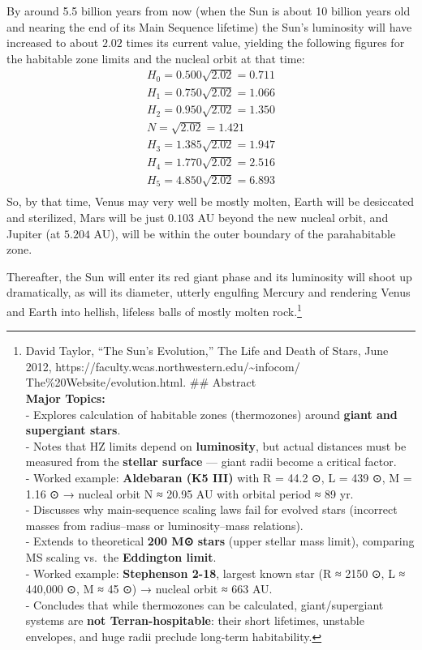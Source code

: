 \documentclass[
  letterpaper,
]{book}
\begin{document}
By around 5.5 billion years from now (when the Sun is about 10 billion
years old and nearing the end of its Main Sequence lifetime) the Sun's
luminosity will have increased to about \(2.02\) times its current
value, yielding the following figures for the habitable zone limits and
the nucleal orbit at that time: \[
\begin{align}
H_0 = 0.500\sqrt{2.02} = 0.711 \\
H_1 = 0.750\sqrt{2.02} = 1.066 \\
H_2 = 0.950\sqrt{2.02} = 1.350 \\
N = \sqrt{2.02} = 1.421 \\
H_3 = 1.385\sqrt{2.02} = 1.947 \\
H_4 = 1.770\sqrt{2.02} = 2.516 \\
H_5 = 4.850\sqrt{2.02} = 6.893 \\
\end{align}
\] So, by that time, Venus may very well be mostly molten, Earth will be
desiccated and sterilized, Mars will be just \(0.103\) AU beyond the new
nucleal orbit, and Jupiter (at \(5.204\) AU), will be within the outer
boundary of the parahabitable zone.

Thereafter, the Sun will enter its red giant phase and its luminosity
will shoot up dramatically, as will its diameter, utterly engulfing
Mercury and rendering Venus and Earth into hellish, lifeless balls of
mostly molten rock.\footnote{David Taylor, ``The Sun's Evolution,'' The
  Life and Death of Stars, June 2012,
  https://faculty.wcas.northwestern.edu/\textasciitilde infocom/
  The\%20Website/evolution.html. \#\# Abstract\\
  \textbf{Major Topics:}\\
  - Explores calculation of habitable zones (thermozones) around
  \textbf{giant and supergiant stars}.\\
  - Notes that HZ limits depend on \textbf{luminosity}, but actual
  distances must be measured from the \textbf{stellar surface} --- giant
  radii become a critical factor.\\
  - Worked example: \textbf{Aldebaran (K5 III)} with R = 44.2 ⊙, L = 439
  ⊙, M = 1.16 ⊙ → nucleal orbit N ≈ 20.95 AU with orbital period ≈ 89
  yr.\\
  - Discusses why main-sequence scaling laws fail for evolved stars
  (incorrect masses from radius--mass or luminosity--mass relations).\\
  - Extends to theoretical \textbf{200 M⊙ stars} (upper stellar mass
  limit), comparing MS scaling vs.~the \textbf{Eddington limit}.\\
  - Worked example: \textbf{Stephenson 2-18}, largest known star (R ≈
  2150 ⊙, L ≈ 440,000 ⊙, M ≈ 45 ⊙) → nucleal orbit ≈ 663 AU.\\
  - Concludes that while thermozones can be calculated, giant/supergiant
  systems are \textbf{not Terran-hospitable}: their short lifetimes,
  unstable envelopes, and huge radii preclude long-term habitability.}
\end{document}
